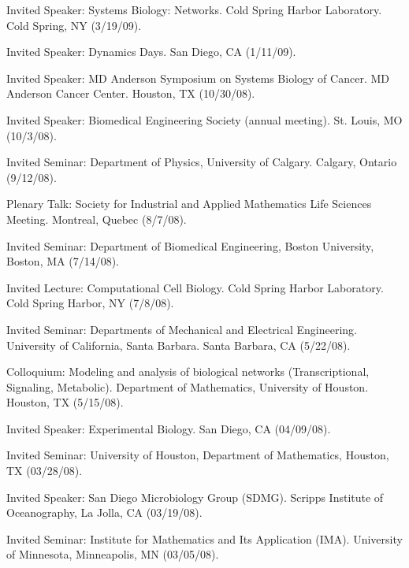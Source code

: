 \item Invited Speaker: Systems Biology: Networks.  Cold Spring Harbor Laboratory.  Cold Spring, NY (3/19/09).

\item Invited Speaker: Dynamics Days. San Diego, CA (1/11/09).

\item Invited Speaker: MD Anderson Symposium on Systems Biology of Cancer. MD Anderson Cancer Center.  Houston, TX (10/30/08). 

\item Invited Speaker: Biomedical Engineering Society (annual meeting).  St. Louis, MO (10/3/08).

\item Invited Seminar: Department of Physics, University of Calgary. Calgary, Ontario (9/12/08).

\item Plenary Talk: Society for Industrial and Applied Mathematics Life Sciences Meeting. Montreal, Quebec (8/7/08).

\item Invited Seminar: Department of Biomedical Engineering, Boston University, Boston, MA (7/14/08).

\item Invited Lecture: Computational Cell Biology. Cold Spring Harbor Laboratory.  Cold Spring Harbor, NY (7/8/08). 

\item Invited Seminar: Departments of Mechanical and Electrical Engineering.  University of California, Santa Barbara. Santa Barbara, CA (5/22/08).

\item Colloquium: Modeling and analysis of biological networks (Transcriptional, Signaling, Metabolic).  Department of Mathematics, University of Houston. Houston, TX (5/15/08). 

\item Invited Speaker: Experimental Biology.  San Diego, CA (04/09/08).

\item Invited Seminar: University of Houston, Department of Mathematics, Houston, TX (03/28/08).

\item Invited Speaker: San Diego Microbiology Group (SDMG).  Scripps Institute of Oceanography, La Jolla, CA (03/19/08).

\item Invited Seminar: Institute for Mathematics and Its Application (IMA).  University of Minnesota, Minneapolis, MN (03/05/08).

